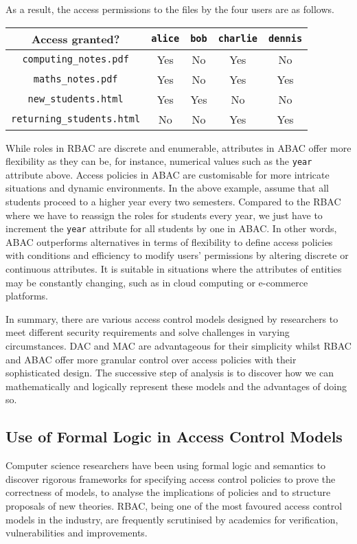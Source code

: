 \documentclass{article}
\begin{document}
As a result, the access permissions to the files by the four users are
as follows.

\begin{center} \begin{tabular}{c|cccc}
    Access granted? & \texttt{alice} & \texttt{bob} & \texttt{charlie}
    & \texttt{dennis}\\ \hline \texttt{computing\_notes.pdf} &
    Yes & No & Yes & No\\ \texttt{maths\_notes.pdf} & Yes & No &
    Yes & Yes\\ \texttt{new\_students.html} & Yes & Yes & No & No\\
    \texttt{returning\_students.html} & No & No & Yes & Yes
\end{tabular} \end{center}

While roles in RBAC are discrete and enumerable, attributes in ABAC offer
more flexibility as they can be, for instance, numerical values such as the
\texttt{year} attribute above. Access policies in ABAC are customisable for
more intricate situations and dynamic environments. In the above example,
assume that all students proceed to a higher year every two semesters. Compared
to the RBAC where we have to reassign the roles for students every year, we
just have to increment the \texttt{year} attribute for all students by one in
ABAC. In other words, ABAC outperforms alternatives in terms of flexibility
to define access policies with conditions and efficiency to modify users'
permissions by altering discrete or continuous attributes. It is suitable
in situations where the attributes of entities may be constantly changing,
such as in cloud computing or e-commerce platforms.

In summary, there are various access control models designed by researchers
to meet different security requirements and solve challenges in varying
circumstances. DAC and MAC are advantageous for their simplicity whilst
RBAC and ABAC offer more granular control over access policies with their
sophisticated design. The successive step of analysis is to discover how we
can mathematically and logically represent these models and the advantages
of doing so.

\subsection{Use of Formal Logic in Access Control Models}

Computer science researchers have been using formal logic and semantics
to discover rigorous frameworks for specifying access control policies to
prove the correctness of models, to analyse the implications of policies
and to structure proposals of new theories. RBAC, being one of the most
favoured access control models in the industry, are frequently scrutinised
by academics for verification, vulnerabilities and improvements.
\end{document}
